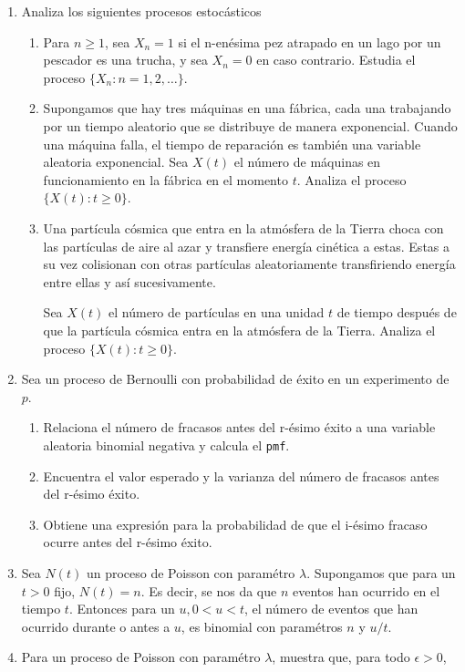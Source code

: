 \documentclass[a4paper,11pt]{report}
\begin{document}
\begin{enumerate}
\item Analiza los siguientes procesos estoc\'asticos

\begin{enumerate}
	\item Para $n\geq 1$, sea  $X_n = 1$ si el n-en\'esima pez  atrapado en un lago por un pescador es una trucha, y sea  $X_n = 0$ en caso contrario. Estudia el proceso $\{X_n: n = 1, 2,\dots\}$.
	\item Supongamos que hay tres m\'aquinas en una f\'abrica, cada una trabajando por un tiempo aleatorio que se distribuye de manera exponencial. Cuando una m\'aquina falla, el tiempo de reparaci\'on es tambi\'en una variable aleatoria exponencial. Sea $X(t)$  el n\'umero  de  m\'aquinas en funcionamiento en  la f\'abrica en el momento $t$. Analiza el proceso $\{X(t): t \geq 0 \}$.
	\item Una part\'icula c\'osmica que entra en la atm\'osfera de la Tierra choca con las part\'iculas de \mbox{aire} al azar y transfiere   energ\'ia cin\'etica a estas. Estas a su vez colisionan con otras part\'iculas \mbox{aleatoriamente} transfiriendo  energ\'ia entre ellas  y as\'i sucesivamente. 
	
	Sea $X(t)$  el n\'umero de part\'iculas en una unidad  $t$ de tiempo despu\'es de que  la part\'icula c\'osmica entra en la atm\'osfera de la Tierra. Analiza el proceso $\{X(t): t \geq 0 \}$.
\end{enumerate}
\item Sea un proceso de Bernoulli con probabilidad de \'exito en un experimento de $p$. 
\begin{enumerate}
	\item Relaciona el n\'umero de fracasos antes del r-\'esimo \'exito a una variable aleatoria binomial negativa y calcula el \texttt{pmf}.
	\item Encuentra el valor esperado y la varianza del n\'umero de fracasos antes del r-\'esimo \'exito.
	\item Obtiene una expresi\'on para la probabilidad de que el i-\'esimo fracaso ocurre antes del r-\'esimo \'exito.
\end{enumerate}
\item Sea $N(t)$ un proceso de Poisson con param\'etro $\lambda$. Supongamos que para un $t > 0 $ fijo, $N(t) = n$. Es decir, se nos da que $n$ eventos han ocurrido en  el tiempo $t$. Entonces para un $u, 0 < u < t$, el n\'umero de eventos que han ocurrido durante o antes a $u$, es binomial con param\'etros $n$ y $u/t$.
\item Para un proceso de Poisson con param\'etro $\lambda $, muestra que, para todo $\epsilon > 0$,


\end{enumerate}
\end{document}
